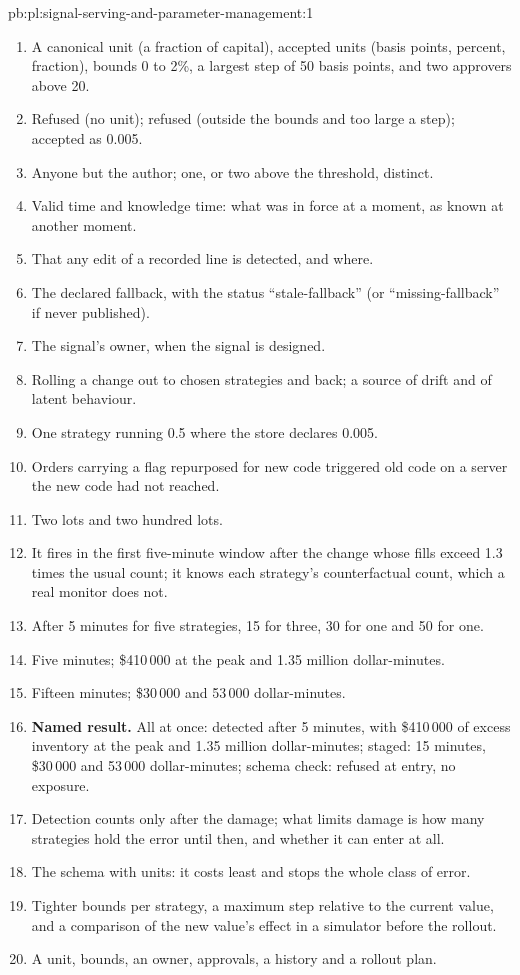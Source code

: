 \begin{solution}{pb:pl:signal-serving-and-parameter-management:1}
\begin{enumerate}
\item A canonical unit (a fraction of capital), accepted units (basis points, percent, fraction), bounds 0 to 2\%, a largest step of 50 basis
points, and two approvers above 20.
\item Refused (no unit); refused (outside the bounds and too large a step); accepted as 0.005.
\item Anyone but the author; one, or two above the threshold, distinct.
\item Valid time and knowledge time: what was in force at a moment, as known at another moment.
\item That any edit of a recorded line is detected, and where.
\item The declared fallback, with the status ``stale-fallback'' (or ``missing-fallback'' if never published).
\item The signal's owner, when the signal is designed.
\item Rolling a change out to chosen strategies and back; a source of drift and of latent behaviour.
\item One strategy running 0.5 where the store declares 0.005.
\item Orders carrying a flag repurposed for new code triggered old code on a server the new code had not reached.
\item Two lots and two hundred lots.
\item It fires in the first five-minute window after the change whose fills exceed 1.3 times the usual count; it knows each strategy's
counterfactual count, which a real monitor does not.
\item After 5 minutes for five strategies, 15 for three, 30 for one and 50 for one.
\item Five minutes; \$410\,000 at the peak and 1.35 million dollar-minutes.
\item Fifteen minutes; \$30\,000 and 53\,000 dollar-minutes.
\item \textbf{Named result.} All at once: detected after 5 minutes, with \$410\,000 of excess inventory at the peak and 1.35 million
dollar-minutes; staged: 15 minutes, \$30\,000 and 53\,000 dollar-minutes; schema check: refused at entry, no exposure.
\item Detection counts only after the damage; what limits damage is how many strategies hold the error until then, and whether it can enter
at all.
\item The schema with units: it costs least and stops the whole class of error.
\item Tighter bounds per strategy, a maximum step relative to the current value, and a comparison of the new value's effect in a simulator
before the rollout.
\item A unit, bounds, an owner, approvals, a history and a rollout plan.
\end{enumerate}
\end{solution}

